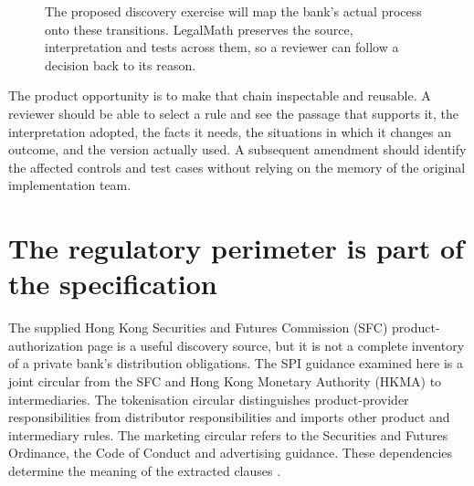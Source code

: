 
\begin{figure}[htbp]
\centering
{}
\caption{The proposed discovery exercise will map the bank's actual process onto
these transitions. LegalMath preserves the source, interpretation and tests across
them, so a reviewer can follow a decision back to its reason.}
\label{fig:manual}
\end{figure}

The product opportunity is to make that chain inspectable and reusable. A
reviewer should be able to select a rule and see the passage that supports it,
the interpretation adopted, the facts it needs, the situations in which it changes
an outcome, and the version actually used. A subsequent amendment should identify
the affected controls and test cases without relying on the memory of the
original implementation team.

\section{The regulatory perimeter is part of the specification}
\label{merge:P-01-problem:01}


The supplied Hong Kong Securities and Futures Commission (SFC) product-authorization
page is a useful discovery source, but it
is not a complete inventory of a private bank's distribution obligations. The
SPI guidance examined here is a joint circular from the SFC and Hong Kong Monetary
Authority (HKMA) to intermediaries. The
tokenisation circular distinguishes product-provider responsibilities from
distributor responsibilities and imports other product and intermediary rules.
The marketing circular refers to the Securities and Futures Ordinance, the Code
of Conduct and advertising guidance. These dependencies determine the meaning of
the extracted clauses \citep{sfcindex,sfcspi,sfctoken2026,sfcmarketing}.

